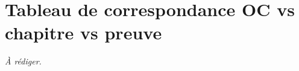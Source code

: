 \chapter{Tableau de correspondance OC vs chapitre vs preuve}\label{annexe:oc-mapping}


\textit{\`A r\'ediger.}
